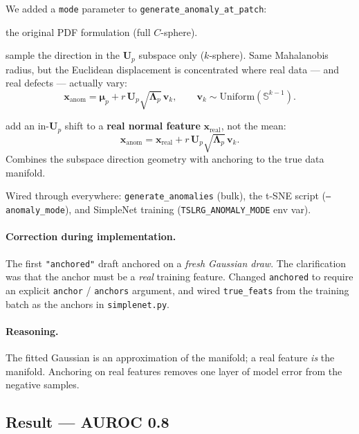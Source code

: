 \documentclass[11pt]{article}
\newcommand{\code}[1]{\texttt{#1}}
\newcommand{\Up}{\mathbf{U}_p}
\newcommand{\bmu}{\boldsymbol{\mu}}
\newcommand{\bLambda}{\boldsymbol{\Lambda}}
\begin{document}
We added a \code{mode} parameter to \code{generate\_anomaly\_at\_patch}:
\begin{description}[noitemsep]
  \item[\code{"default"}] the original PDF formulation (full $C$-sphere).
  \item[\code{"subspace"}] sample the direction in the $\Up$ subspace only
    ($k$-sphere). Same Mahalanobis radius, but the Euclidean displacement is
    concentrated where real data --- and real defects --- actually vary:
    \begin{equation}
      \mathbf{x}_{\text{anom}}
        = \bmu_p + r\,\Up \sqrt{\bLambda_p}\, \mathbf{v}_k,
        \qquad \mathbf{v}_k \sim \text{Uniform}(\mathbb{S}^{k-1}).
    \end{equation}
  \item[\code{"anchored"}] add an in-$\Up$ shift to a \textbf{real normal
    feature} $\mathbf{x}_{\text{real}}$, not the mean:
    \begin{equation}
      \mathbf{x}_{\text{anom}}
        = \mathbf{x}_{\text{real}} + r\,\Up \sqrt{\bLambda_p}\, \mathbf{v}_k.
    \end{equation}
    Combines the subspace direction geometry with anchoring to the true data
    manifold.
\end{description}
Wired through everywhere: \code{generate\_anomalies} (bulk), the t-SNE script
(\code{--anomaly\_mode}), and SimpleNet training (\code{TSLRG\_ANOMALY\_MODE} env
var).

\paragraph{Correction during implementation.}
The first \code{"anchored"} draft anchored on a \emph{fresh Gaussian draw}. The
clarification was that the anchor must be a \emph{real} training feature. Changed
\code{anchored} to require an explicit \code{anchor} / \code{anchors} argument,
and wired \code{true\_feats} from the training batch as the anchors in
\code{simplenet.py}.

\paragraph{Reasoning.}
The fitted Gaussian is an approximation of the manifold; a real feature \emph{is}
the manifold. Anchoring on real features removes one layer of model error from the
negative samples.

\subsection{Result --- AUROC 0.8}
\end{document}
